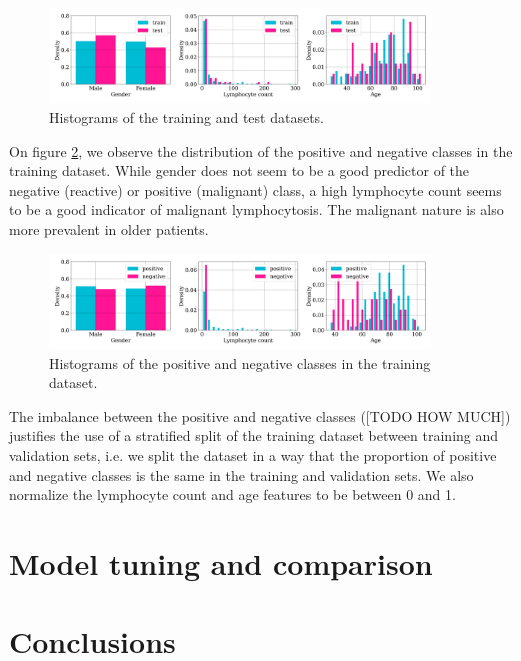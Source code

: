 \documentclass{midl}
\begin{document}
\begin{figure}[h!]
    \centering
    \includegraphics[width=0.9\textwidth]{figures/train_test_histograms.png}
    \caption{Histograms of the training and test datasets.}
    \label{fig:train_test_histograms}
\end{figure}

On figure \ref{fig:positive_negative_histograms}, we observe the distribution of the positive and negative classes in the training dataset. While gender does not seem to be a good predictor of the negative (reactive) or positive (malignant) class, a high lymphocyte count seems to be a good indicator of malignant lymphocytosis. The malignant nature is also more prevalent in older patients.

\begin{figure}[h!]
    \centering
    \includegraphics[width=0.9\textwidth]{figures/positive_negative_histograms.png}
    \caption{Histograms of the positive and negative classes in the training dataset.}
    \label{fig:positive_negative_histograms}
\end{figure}

The imbalance between the positive and negative classes ([TODO HOW MUCH]) justifies the use of a stratified split of the training dataset between training and validation sets, i.e. we split the dataset in a way that the proportion of positive and negative classes is the same in the training and validation sets. We also normalize the lymphocyte count and age features to be between 0 and 1.

\section{Model tuning and comparison}
\label{sec:evaluation}

\section{Conclusions}
\label{sec:conclusion}

\newpage

\end{document}
